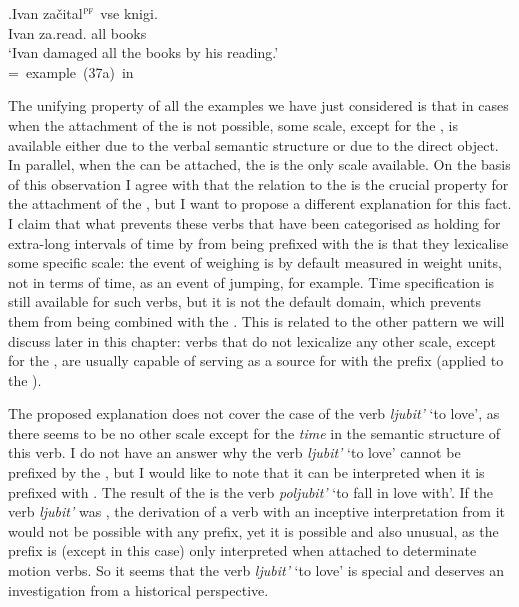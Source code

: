 \exg.\label{ex:zachital}Ivan za\v{c}ital$^{\textsc{pf}}$ vse knigi.\\
Ivan za.read. all books\\
`Ivan damaged all the books by his reading.'\\\hbox{}\hfill\hbox{= example (37a) in \citealt[246]{Braginsky:08}}

The unifying property of all the examples we have just considered is that in cases when the attachment of the   is not possible, some scale, except for the , is available either due to the verbal semantic structure or due to the direct object. In parallel, when the   can be attached, the  is the only scale available. On the basis of this observation I agree with \citet{Paducheva:96} that the relation to the  is the crucial property for the attachment of the  , but I want to propose a different explanation for this fact. I claim that what prevents these verbs that have been categorised as holding for extra-long intervals of time by \citet{Paducheva:96} from being prefixed with the   is that they lexicalise some specific scale: the event of weighing is by default measured in weight units, not in terms of time, as an event of jumping, for example. Time specification is still available for such verbs, but it is not the default domain, which prevents them from being combined with the  . This is related to the other pattern we will discuss later in this chapter: verbs that do not lexicalize any other scale, except for the , are usually capable of serving as a source for  with the  prefix  (applied to the ). 

The proposed explanation does not cover the case of the verb \textit{ljubit'} `to love', as there seems to be no other scale except for the \textit{time} in the semantic structure of this verb. I do not have an answer why the verb \textit{ljubit'} `to love' cannot be prefixed by the  , but I would like to note that it can be interpreted  when it is prefixed with . The result of the  is the verb \textit{poljubit'} `to fall in love with'. If the verb \textit{ljubit'} was , the derivation of a verb with an inceptive interpretation from it would not be possible with any prefix, yet it is possible and also unusual, as the prefix  is (except in this case) only interpreted  when attached to determinate motion verbs. So it seems that the verb \textit{ljubit'} `to love' is special and deserves an investigation from a historical perspective. 

